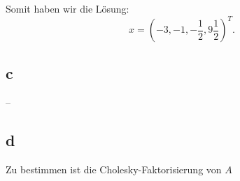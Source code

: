 \documentclass[12pt]{article}
\begin{document}
Somit haben wir die Lösung:
$$
x = (-3,-1,-\frac{1}{2},9 \frac{1}{2})^T.
$$

\subsection*{c}
-- 
\newpage

\subsection*{d}
Zu bestimmen ist die Cholesky-Faktorisierung von $A$






\end{document}
